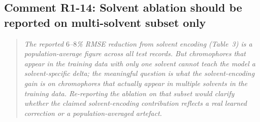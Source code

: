 \documentclass[11pt]{article}
\newenvironment{reviewer}{%
  \begin{quote}\itshape\color{black!70}}{%
  \end{quote}}
\begin{document}
\subsection*{Comment R1-14: Solvent ablation should be reported on multi-solvent subset only}
\begin{reviewer}
The reported $6$--$8$\% RMSE reduction from solvent encoding (Table~3) is a population-average figure across all test records. But chromophores that appear in the training data with only one solvent cannot teach the model a solvent-specific delta; the meaningful question is what the solvent-encoding gain is on chromophores that actually appear in multiple solvents in the training data. Re-reporting the ablation on that subset would clarify whether the claimed solvent-encoding contribution reflects a real learned correction or a population-averaged artefact.
\end{reviewer}
\end{document}
